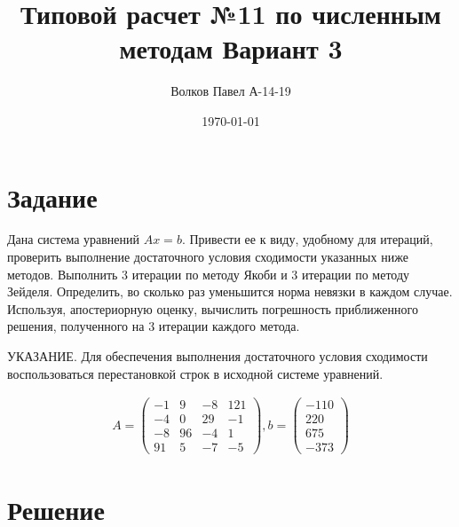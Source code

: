 \documentclass[a4paper,12pt]{report} %
\author{Волков Павел А-14-19}
\title{Типовой расчет №11 по численным методам Вариант 3}
\date{\today}
\begin{document}

\maketitle

\newpage
\section*{Задание}
Дана система уравнений $Ax = b$. Привести ее к виду, удобному для итераций, проверить выполнение достаточного условия сходимости указанных ниже методов. Выполнить 3 итерации по методу Якоби и 3 итерации по методу Зейделя. Определить, во сколько раз уменьшится норма невязки в каждом случае. Используя, апостериорную оценку, вычислить погрешность приближенного решения, полученного на 3 итерации каждого метода.

УКАЗАНИЕ. Для обеспечения выполнения достаточного  условия сходимости воспользоваться перестановкой строк в исходной системе уравнений.

\begin{gather*}
	A = 
	\begin{pmatrix}
		-1 & 9 & -8 &  121 \\
		-4 & 0 & 29 & -1 \\
		-8 & 96 & -4 & 1 \\
		91 & 5 & -7 & -5
	\end{pmatrix},
	b = 
	\begin{pmatrix}
		-110 \\ 220 \\ 675 \\ -373
	\end{pmatrix}
\end{gather*}
\section*{Решение}
\end{document}
